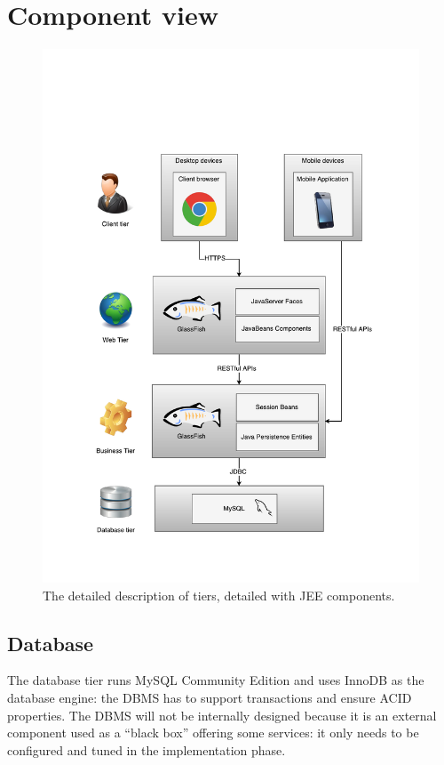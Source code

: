\section{Component view}
\label{sec:component-view}

\begin{figure}
\centering
\includegraphics[width=\textwidth]{diagrams/JEE_Tiers}
\caption{The detailed description of tiers, detailed with JEE components.}
\label{fig:tiers-jee}
\end{figure}

\subsection{Database}
The database tier runs MySQL Community Edition and uses InnoDB as the database engine: the DBMS has to support transactions and ensure ACID properties.
The DBMS will not be internally designed because it is an external component used as a ``black box'' offering some services: it only needs to be configured and tuned in the implementation phase.

